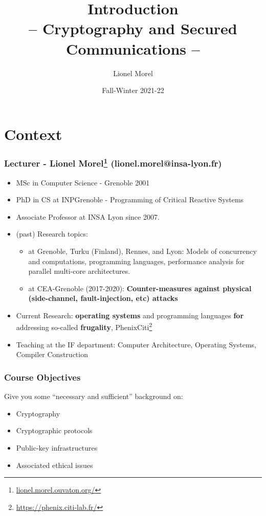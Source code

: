 \documentclass[
hyperref={pdfpagelabels=false}
,xcolor=table
]
{beamer}
\title[CSC - Intro]{Introduction \\ -- Cryptography and Secured Communications --}
\author[]{Lionel Morel}
\institute[]{Telecommunications - INSA Lyon}
\date{Fall-Winter 2021-22}
\begin{document}
\begin{frame}
  \maketitle
\end{frame}

\section{Context}

\begin{frame}
  \frametitle{Lecturer - Lionel Morel\footnote{\url{lionel.morel.ouvaton.org/}} (lionel.morel@insa-lyon.fr)}
  \begin{itemize}
  \item MSc in Computer Science - Grenoble 2001
  \item PhD in CS at INPGrenoble - Programming of Critical Reactive Systems
  \item Associate Professor at INSA Lyon since 2007. 
  \item (past) Research topics:
    \begin{itemize}
    \item at Grenoble, Turku (Finland), Rennes, and Lyon: Models of
      concurrency and computations, programming languages, performance
      analysis for parallel multi-core architectures.
    \item at CEA-Grenoble (2017-2020): \textbf{Counter-measures
        against physical (side-channel, fault-injection, etc) attacks}
    \end{itemize}
  \item Current Research: \textbf{operating systems} and programming
    languages \textbf{for} addressing so-called \textbf{frugality}, Phenix\@ Citi\footnote{\url{https://phenix.citi-lab.fr/}}
  \item Teaching at the IF department: Computer Architecture,
    Operating Systems, Compiler Construction
  \end{itemize}
\end{frame}



\begin{frame}
  \frametitle{Course Objectives}
  Give you some ``necessary and sufficient'' background on:
  \begin{itemize}
  \item Cryptography
  \item Cryptographic protocols
  \item Public-key infrastructures
  \item Associated ethical issues
  \end{itemize}
\end{frame}
\end{document}
